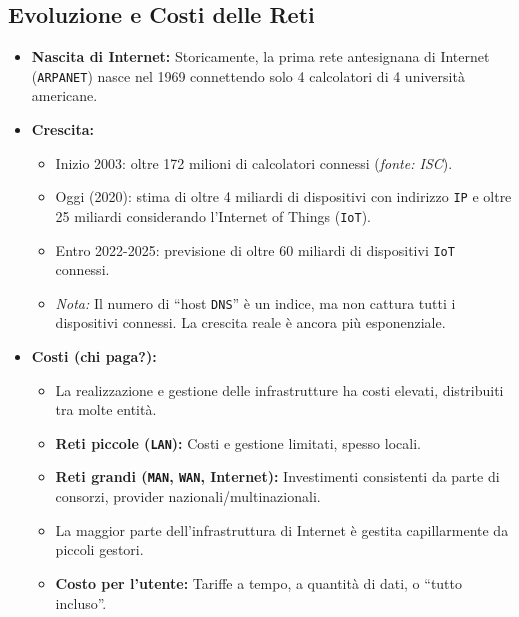 \documentclass{article}
\begin{document}
\subsection{Evoluzione e Costi delle Reti}
\begin{itemize}
    \item \textbf{Nascita di Internet:} Storicamente, la prima rete antesignana di Internet (\texttt{ARPANET}) nasce nel 1969 connettendo solo 4 calcolatori di 4 università americane.
    \item \textbf{Crescita:}
    \begin{itemize}
        \item Inizio 2003: oltre 172 milioni di calcolatori connessi (\textit{fonte: ISC}).
        \item Oggi (2020): stima di oltre 4 miliardi di dispositivi con indirizzo \texttt{IP} e oltre 25 miliardi considerando l'Internet of Things (\texttt{IoT}).
        \item Entro 2022-2025: previsione di oltre 60 miliardi di dispositivi \texttt{IoT} connessi.
        \item \textit{Nota:} Il numero di “host \texttt{DNS}” è un indice, ma non cattura tutti i dispositivi connessi. La crescita reale è ancora più esponenziale.
    \end{itemize}
    \item \textbf{Costi (chi paga?):}
    \begin{itemize}
        \item La realizzazione e gestione delle infrastrutture ha costi elevati, distribuiti tra molte entità.
        \item \textbf{Reti piccole (\texttt{LAN}):} Costi e gestione limitati, spesso locali.
        \item \textbf{Reti grandi (\texttt{MAN}, \texttt{WAN}, Internet):} Investimenti consistenti da parte di consorzi, provider nazionali/multinazionali.
        \item La maggior parte dell'infrastruttura di Internet è gestita capillarmente da piccoli gestori.
        \item \textbf{Costo per l'utente:} Tariffe a tempo, a quantità di dati, o “tutto incluso”.
    \end{itemize}
\end{itemize}
\end{document}
